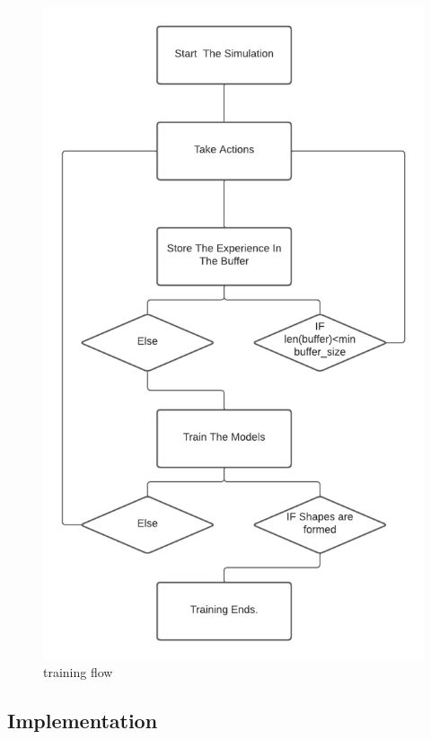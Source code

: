 \documentclass[12pt]{extarticle}
\begin{document}
 \begin{figure}[h]  
\centering
\includegraphics[scale=0.9]{training_workflow3}
\caption[training flow]{training flow}
\end{figure}



\newpage
\pagebreak
\hspace{0pt}
\vfill
\begin{center}
\section{Implementation}
\end{center}
\vfill
\hspace{0pt}
\end{document}
